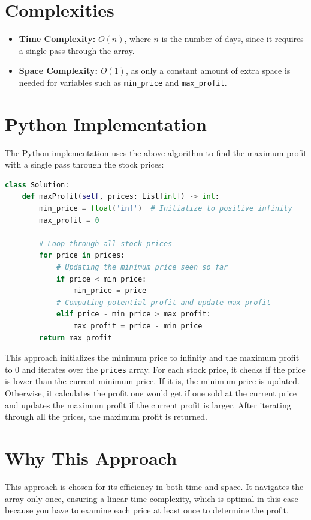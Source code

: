 \section*{Complexities}
\begin{itemize}
    \item \textbf{Time Complexity:} \(O(n)\), where \(n\) is the number of days, since it requires a single pass through the array.
    \item \textbf{Space Complexity:} \(O(1)\), as only a constant amount of extra space is needed for variables such as \texttt{min\_price} and \texttt{max\_profit}.
\end{itemize}

\section*{Python Implementation}
The Python implementation uses the above algorithm to find the maximum profit with a single pass through the stock prices:

\begin{fullwidth}
\begin{lstlisting}[language=Python]
class Solution:
    def maxProfit(self, prices: List[int]) -> int:
        min_price = float('inf')  # Initialize to positive infinity
        max_profit = 0
        
        # Loop through all stock prices
        for price in prices:
            # Updating the minimum price seen so far
            if price < min_price:
                min_price = price
            # Computing potential profit and update max profit
            elif price - min_price > max_profit:
                max_profit = price - min_price
        return max_profit
\end{lstlisting}

\end{fullwidth}

This approach initializes the minimum price to infinity and the maximum profit to 0 and iterates over the \texttt{prices} array. For each stock price, it checks if the price is lower than the current minimum price. If it is, the minimum price is updated. Otherwise, it calculates the profit one would get if one sold at the current price and updates the maximum profit if the current profit is larger. After iterating through all the prices, the maximum profit is returned.

\section*{Why This Approach}
This approach is chosen for its efficiency in both time and space. It navigates the array only once, ensuring a linear time complexity, which is optimal in this case because you have to examine each price at least once to determine the profit.

